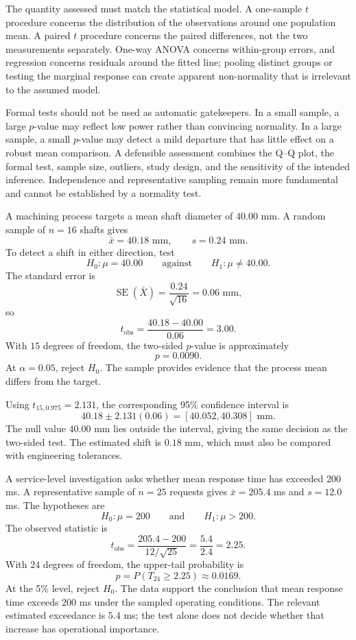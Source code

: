 The quantity assessed must match the statistical model. A one-sample $t$ procedure concerns the distribution of the observations around one population mean. A paired $t$ procedure concerns the paired differences, not the two measurements separately. One-way ANOVA concerns within-group errors, and regression concerns residuals around the fitted line; pooling distinct groups or testing the marginal response can create apparent non-normality that is irrelevant to the assumed model.

Formal tests should not be used as automatic gatekeepers. In a small sample, a large $p$-value may reflect low power rather than convincing normality. In a large sample, a small $p$-value may detect a mild departure that has little effect on a robust mean comparison. A defensible assessment combines the Q--Q plot, the formal test, sample size, outliers, study design, and the sensitivity of the intended inference. Independence and representative sampling remain more fundamental and cannot be established by a normality test.

\begin{example}\par
A machining process targets a mean shaft diameter of $40.00$ mm. A random sample of $n=16$ shafts gives
\[
\bar x=40.18\text{ mm},
\qquad
s=0.24\text{ mm}.
\]
To detect a shift in either direction, test
\[
H_0:\mu=40.00
\qquad\text{against}\qquad
H_1:\mu\neq40.00.
\]
The standard error is
\[
\operatorname{SE}(\bar X)
=\frac{0.24}{\sqrt{16}}
=0.06\text{ mm},
\]
so
\[
t_{\mathrm{obs}}
=\frac{40.18-40.00}{0.06}
=3.00.
\]
With $15$ degrees of freedom, the two-sided $p$-value is approximately
\[
p=0.0090.
\]
At $\alpha=0.05$, reject $H_0$. The sample provides evidence that the process mean differs from the target.

Using $t_{15,0.975}=2.131$, the corresponding 95\% confidence interval is
\[
40.18\pm2.131(0.06)
=[40.052,40.308]\text{ mm}.
\]
The null value $40.00$ mm lies outside the interval, giving the same decision as the two-sided test. The estimated shift is $0.18$ mm, which must also be compared with engineering tolerances.
\end{example}

\begin{example}\par
A service-level investigation asks whether mean response time has exceeded $200$ ms. A representative sample of $n=25$ requests gives $\bar x=205.4$ ms and $s=12.0$ ms. The hypotheses are
\[
H_0:\mu=200
\qquad\text{and}\qquad
H_1:\mu>200.
\]
The observed statistic is
\[
t_{\mathrm{obs}}
=\frac{205.4-200}{12/\sqrt{25}}
=\frac{5.4}{2.4}
=2.25.
\]
With $24$ degrees of freedom, the upper-tail probability is
\[
p=P(T_{24}\geq2.25)\approx0.0169.
\]
At the 5\% level, reject $H_0$. The data support the conclusion that mean response time exceeds $200$ ms under the sampled operating conditions. The relevant estimated exceedance is $5.4$ ms; the test alone does not decide whether that increase has operational importance.
\end{example}

